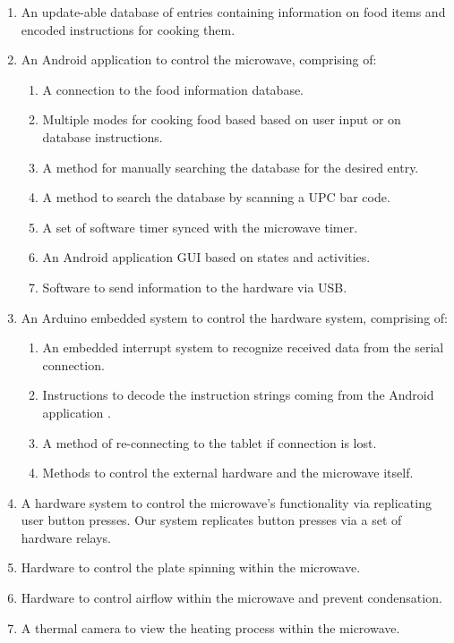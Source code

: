 \documentclass[10pt,journal,letterpaper,twocolumn]{IEEEtran}
\begin{document}
\begin{enumerate}
\item An update-able database of entries containing information on food items and encoded instructions for cooking them.
\item An Android application to control the microwave, comprising of:
\begin{enumerate}
	\item A connection to the food information database.
    \item Multiple modes for cooking food based based on user input or on database instructions.
    \item A method for manually searching the database for the desired entry.
    \item A method to search the database by scanning a UPC bar code.
    \item A set of software timer synced with the microwave timer.
    \item An Android application GUI based on states and activities.
    \item Software to send information to the hardware via USB.
\end{enumerate}
\item An Arduino embedded system to control the hardware system, comprising of:
\begin{enumerate}
	\item An embedded interrupt system to recognize received data from the serial connection.
    \item Instructions to decode the instruction strings coming from the Android application \cite{raspberryPicrowaveRepo}.
    \item A method of re-connecting to the tablet if connection is lost.
    \item Methods to control the external hardware and the microwave itself.
\end{enumerate}
\item A hardware system to control the microwave's functionality via replicating user button presses.  Our system replicates button presses via a set of hardware relays.
\item Hardware to control the plate spinning within the microwave.
\item Hardware to control airflow within the microwave and prevent condensation.
\item A thermal camera to view the heating process within the microwave.
\end{enumerate}
\end{document}
